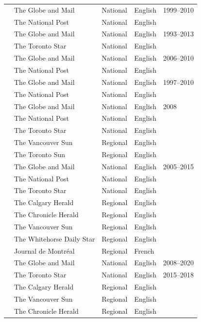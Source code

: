 \documentclass[12pt]{article}
\renewcommand\_{\texttt{\detokenize{_}\allowbreak}}
\begin{document}
{\begin{longtable}{p{5cm}p{6cm}p{4cm}p{3cm}p{3.5cm}}
\midrule
\textcite{stoddart_canadian_2015} & The Globe and Mail & National & English & 1999--2010 \\
& The National Post & National & English & \\
\midrule
\textcite{ford_coverage_2015} & The Globe and Mail & National & English & 1993--2013 \\
& The Toronto Star & National & English & \\
\midrule
\textcite{stoddart_endangered_2016} & The Globe and Mail & National & English & 2006--2010 \\
& The National Post & National & English & \\
\midrule
\textcite{stoddart_media_2017} & The Globe and Mail & National & English & 1997--2010 \\
& The National Post & National & English & \\
\midrule
\textcite{barkemeyer_media_2017} & The Globe and Mail & National & English & 2008 \\
& The National Post & National & English & \\
& The Toronto Star & National & English & \\
& The Vancouver Sun & Regional & English & \\
& The Toronto Sun & Regional & English & \\
\midrule
\textcite{king_how_2019} & The Globe and Mail & National & English & 2005--2015 \\
& The National Post & National & English & \\
& The Toronto Star & National & English & \\
& The Calgary Herald & Regional & English & \\
& The Chronicle Herald & Regional & English & \\
& The Vancouver Sun & Regional & English & \\
& The Whitehorse Daily Star & Regional & English & \\
& Journal de Montréal & Regional & French & \\
\midrule
\textcite{pillod_reframing_2021} & The Globe and Mail & National & English & 2008--2020 \\
\midrule
\textcite{brandt_news_2021} & The Toronto Star & National & English & 2015--2018 \\
& The Calgary Herald & Regional & English & \\
& The Vancouver Sun & Regional & English & \\
& The Chronicle Herald & Regional & English & \\

\end{longtable}}
\end{document}
